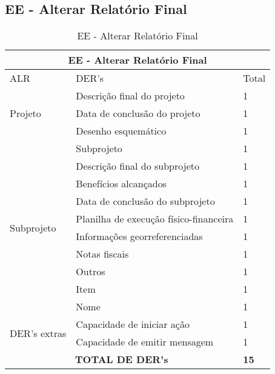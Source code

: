 \pagebreak

  \subsection{EE - Alterar Relatório Final}
  \begin{table}[!h]
\centering
\caption{EE - Alterar Relatório Final}
\label{ee_alterar_relatorio_final}
\begin{tabular}{|l|l|l|}
\hline
\multicolumn{3}{|c|}{EE - Alterar Relatório Final}                                                                 \\ \hline
ALR                           & DER's                                                & Total              \\ \hline
\multirow{3}{*}{Projeto}     & Descrição final do projeto             & 1 \\ \cline{2-3}
                             & Data de conclusão do projeto           & 1 \\ \cline{2-3}
                             & Desenho esquemático                    & 1 \\ \cline{2-3} \hline
\multirow{10}{*}{Subprojeto} & Subprojeto                             & 1 \\ \cline{2-3}
                             & Descrição final do subprojeto          & 1 \\ \cline{2-3}
                             & Benefícios alcançados                  & 1 \\ \cline{2-3}
                             & Data de conclusão do subprojeto        & 1 \\ \cline{2-3}
                             & Planilha de execução físico-financeira & 1 \\ \cline{2-3}
                             & Informações georreferenciadas          & 1 \\ \cline{2-3}
                             & Notas fiscais                          & 1 \\ \cline{2-3}
                             & Outros                                 & 1 \\ \cline{2-3}
                             & Item                                   & 1 \\ \cline{2-3}
                             & Nome                                   & 1 \\ \cline{2-3} \hline
\multirow{2}{*}{DER's extras} & Capacidade de iniciar ação             & 1 \\ \cline{2-3}
                 & Capacidade de emitir mensagem& 1 \\ \hline
\multicolumn{2}{|c|}{\textbf{TOTAL DE DER's}}                                                 & \textbf{15}                 \\ \hline
\end{tabular}
\end{table}

